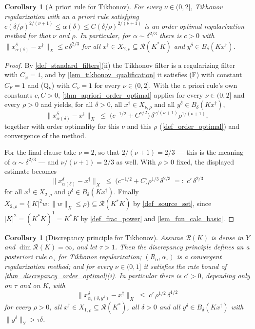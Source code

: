 \documentclass[a4paper]{report}
\theoremstyle{plain}
\newtheorem{corollary}[theorem]{Corollary}
\theoremstyle{definition}
\theoremstyle{remark}
\newcommand{\Ran}{\mathcal{R}}
\newcommand{\dg}{^{\dagger}}
\begin{document}
\begin{corollary}[A priori rule for Tikhonov]
  \label{cor_tikhonov_apriori}
  For every $\nu \in (0,2]$, Tikhonov regularization with an a priori rule satisfying
  $c(\delta/\rho)^{2/(\nu+1)} \le \alpha(\delta) \le C(\delta/\rho)^{2/(\nu+1)}$ is an
  order optimal regularization method for that $\nu$ and $\rho$.  In particular, for
  $\alpha \sim \delta^{2/3}$ there is $c > 0$ with
  $\|x^{\delta}_{\alpha(\delta)} - x\dg\|_X \le c\,\delta^{2/3}$ for all
  $x\dg \in X_{2,\rho} \subseteq \Ran(K^{*}K)$ and $y^{\delta} \in B_{\delta}(Kx\dg)$.
\end{corollary}

\begin{proof}
  By \cref{def_standard_filters}(ii) the Tikhonov filter is a regularizing filter with
  $C_{\varphi} = 1$, and by \cref{lem_tikhonov_qualification} it satisfies (F) with
  constant $C_F = 1$ and (Q$_{\nu}$) with $C_{\nu} = 1$ for every $\nu \in (0,2]$.  With
  the a priori rule's own constants $c, C > 0$, \cref{thm_apriori_order_optimal} applies
  for every $\nu \in (0,2]$ and every $\rho > 0$ and yields, for all $\delta > 0$, all
  $x\dg \in X_{\nu,\rho}$ and all $y^{\delta} \in B_{\delta}(Kx\dg)$,
  \[
    \|x^{\delta}_{\alpha(\delta)} - x\dg\|_X \;\le\;
      \bigl(c^{-1/2} + C^{\nu/2}\bigr)\,
      \delta^{\nu/(\nu+1)}\rho^{1/(\nu+1)} ,
  \]
  together with order optimality for this $\nu$ and this $\rho$
  (\cref{def_order_optimal}) and convergence of the method.

  For the final clause take $\nu = 2$, so that $2/(\nu+1) = 2/3$ --- this is the meaning
  of $\alpha \sim \delta^{2/3}$ --- and $\nu/(\nu+1) = 2/3$ as well.  With $\rho > 0$
  fixed, the displayed estimate becomes
  \[
    \|x^{\delta}_{\alpha(\delta)} - x\dg\|_X \;\le\;
      \bigl(c^{-1/2} + C\bigr)\rho^{1/3}\,\delta^{2/3}
      \;=:\; c'\,\delta^{2/3}
  \]
  for all $x\dg \in X_{2,\rho}$ and $y^{\delta} \in B_{\delta}(Kx\dg)$.  Finally
  $X_{2,\rho} = \{|K|^{2}w : \|w\|_X \le \rho\} \subseteq \Ran(K^{*}K)$ by
  \cref{def_source_set}, since $|K|^{2} = (K^{*}K)^{1} = K^{*}K$ by \cref{def_frac_power}
  and \cref{lem_fun_calc_basic}.
\end{proof}




\begin{corollary}[Discrepancy principle for Tikhonov]
  \label{cor_tikhonov_discrepancy}
  Assume $\Ran(K)$ is dense in $Y$ and $\dim\Ran(K) = \infty$, and let $\tau > 1$.  Then
  the discrepancy principle defines an a posteriori rule $\alpha_{\tau}$ for Tikhonov
  regularization; $(R_{\alpha},\alpha_{\tau})$ is a convergent regularization method; and
  for every $\nu \in (0,1]$ it satisfies the rate bound of
  \cref{thm_discrepancy_order_optimal}(i).  In particular there is $c' > 0$, depending only on $\tau$ and on $K$, with
  \[
    \|x^{\delta}_{\alpha_{\tau}(\delta,y^{\delta})} - x\dg\|_X
      \;\le\; c'\,\rho^{1/2}\,\delta^{1/2}
  \]
  for every $\rho > 0$, all $x\dg \in X_{1,\rho} \subseteq \Ran(K^{*})$, all $\delta > 0$
  and all
  $y^{\delta} \in B_{\delta}(Kx\dg)$ \emph{with} $\|y^{\delta}\|_Y > \tau\delta$.
\end{corollary}
\end{document}
